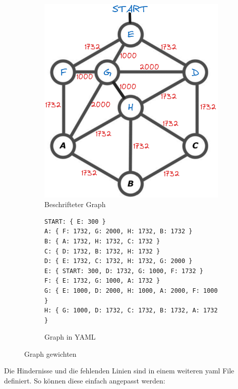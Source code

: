 \begin{figure}[H]
\centering
\begin{subfigure}{0.37\textwidth}
\centering
\includegraphics[width=0.95\linewidth]{img/graph_with_weighted_edges_1.png} 
\caption{Beschrifteter Graph}
\label{fig:labeled-graph}
\end{subfigure}
\begin{subfigure}{0.6\textwidth}
\begin{footnotesize}
\begin{verbatim}
START: { E: 300 }
A: { F: 1732, G: 2000, H: 1732, B: 1732 }
B: { A: 1732, H: 1732, C: 1732 }
C: { D: 1732, B: 1732, H: 1732 }
D: { E: 1732, C: 1732, H: 1732, G: 2000 }
E: { START: 300, D: 1732, G: 1000, F: 1732 }
F: { E: 1732, G: 1000, A: 1732 }
G: { E: 1000, D: 2000, H: 1000, A: 2000, F: 1000 }
H: { G: 1000, D: 1732, C: 1732, B: 1732, A: 1732 }
\end{verbatim}
\end{footnotesize}
\caption{Graph in YAML}
\label{fig:graph-yaml}
\end{subfigure}
\caption{Graph gewichten}
\label{fig:labeled-graph-and-yaml}
\end{figure}

Die Hindernisse und die fehlenden Linien sind in einem weiteren \gls{yaml} File definiert. So können diese einfach angepasst werden:

